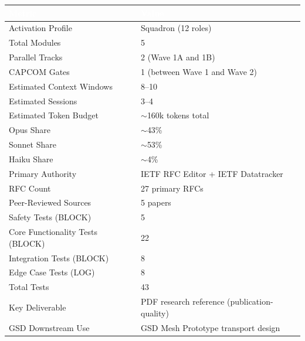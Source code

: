 \documentclass[11pt,letterpaper]{article}
\newcommand{\tableheader}[1]{\textbf{\sffamily\textcolor{white}{#1}}}
\begin{document}
\begin{center}
\begin{tabularx}{\textwidth}{L{5cm}X}
\toprule
{}
\tableheader{Metric} & \tableheader{Value} \\
\midrule
Activation Profile & Squadron (12 roles) \\
Total Modules & 5 \\
Parallel Tracks & 2 (Wave 1A and 1B) \\
CAPCOM Gates & 1 (between Wave 1 and Wave 2) \\
Estimated Context Windows & 8--10 \\
Estimated Sessions & 3--4 \\
Estimated Token Budget & $\sim$160k tokens total \\
Opus Share & $\sim$43\% \\
Sonnet Share & $\sim$53\% \\
Haiku Share & $\sim$4\% \\
Primary Authority & IETF RFC Editor + IETF Datatracker \\
RFC Count & 27 primary RFCs \\
Peer-Reviewed Sources & 5 papers \\
Safety Tests (BLOCK) & 5 \\
Core Functionality Tests (BLOCK) & 22 \\
Integration Tests (BLOCK) & 8 \\
Edge Case Tests (LOG) & 8 \\
Total Tests & 43 \\
Key Deliverable & PDF research reference (publication-quality) \\
GSD Downstream Use & GSD Mesh Prototype transport design \\
\bottomrule
\end{tabularx}
\end{center}

\vspace{2em}
\end{document}
